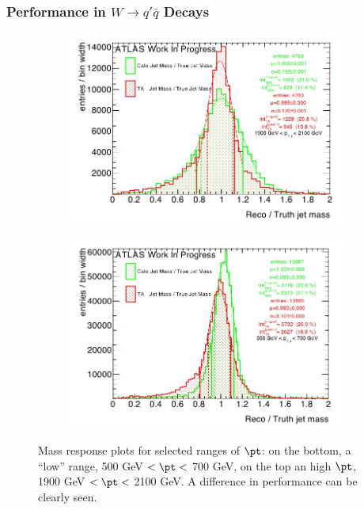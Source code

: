 \subsubsection{Performance in $W \to q'\bar{q}$ Decays}

\begin{figure}
    \centering
    \begin{subfigure}[b]{0.5\textwidth}
	\centering
        \includegraphics[width=\textwidth]{jet_part/mta/highptmta.png}
   
    \end{subfigure}
    \begin{subfigure}[b]{0.5\textwidth}
	\centering
        \includegraphics[width=\textwidth]{jet_part/mta/lowptmta.png}
 
    \end{subfigure}
    \caption[Mass response plots for the $\mta$]{Mass response plots for selected ranges of $\pt$: on the bottom, a ``low'' range, 500 GeV $<\pt<$ 700 GeV, on the top an high $\pt$, 1900 GeV $<\pt<$ 2100 GeV. A difference in performance can be clearly seen.} 
    \label{fig:mta2}
\end{figure}


